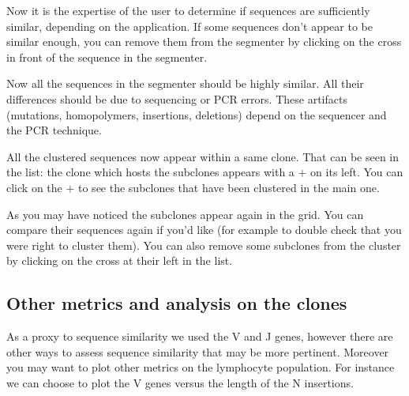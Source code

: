 \documentclass[11pt]{article}
\begin{document}
Now it is the expertise of the user to determine if sequences are sufficiently
similar, depending on the application. If some sequences don't appear to be similar enough, you can remove
them from the segmenter by clicking on the cross in front of the sequence in
the segmenter.

Now all the sequences in the segmenter should be highly similar. All their
differences should be due to sequencing or PCR errors.
These artifacts (mutations, homopolymers, insertions, deletions)
depend on the sequencer and the PCR technique.


All the clustered sequences now appear within a same clone. That can be seen
in the list: the clone which hosts the subclones appears with a $+$ on its
left. You can click on the $+$ to see the subclones that have been clustered in
the main one.

As you may have noticed the subclones appear again in the grid. You can
compare their sequences again if you'd like (for example to double check that
you were right to cluster them). You can also remove some subclones from the
cluster by clicking on the cross at their left in the list.




\subsection{Other metrics and analysis on the clones}

As a proxy to sequence similarity we used the V and J genes, however there are
other ways to assess sequence similarity that may be more pertinent.
Moreover you may want to plot other metrics on the lymphocyte population.
%
For instance we can choose to plot the V genes versus the length of the N
insertions.
\end{document}
